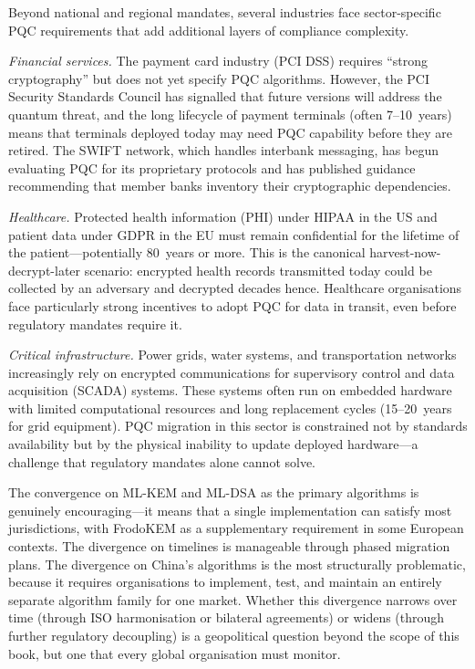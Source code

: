 Beyond national and regional mandates, several industries face sector-specific PQC requirements that add additional layers of compliance complexity.

\emph{Financial services.} The payment card industry (PCI DSS) requires ``strong cryptography'' but does not yet specify PQC algorithms. However, the PCI Security Standards Council has signalled that future versions will address the quantum threat, and the long lifecycle of payment terminals (often 7--10~years) means that terminals deployed today may need PQC capability before they are retired. The SWIFT network, which handles interbank messaging, has begun evaluating PQC for its proprietary protocols and has published guidance recommending that member banks inventory their cryptographic dependencies.

\emph{Healthcare.} Protected health information (PHI) under HIPAA in the US and patient data under GDPR in the EU must remain confidential for the lifetime of the patient---potentially 80~years or more. This is the canonical harvest-now-decrypt-later scenario: encrypted health records transmitted today could be collected by an adversary and decrypted decades hence. Healthcare organisations face particularly strong incentives to adopt PQC for data in transit, even before regulatory mandates require it.

\emph{Critical infrastructure.} Power grids, water systems, and transportation networks increasingly rely on encrypted communications for supervisory control and data acquisition (SCADA) systems. These systems often run on embedded hardware with limited computational resources and long replacement cycles (15--20~years for grid equipment). PQC migration in this sector is constrained not by standards availability but by the physical inability to update deployed hardware---a challenge that regulatory mandates alone cannot solve.

The convergence on ML-KEM and ML-DSA as the primary algorithms is genuinely encouraging---it means that a single implementation can satisfy most jurisdictions, with FrodoKEM as a supplementary requirement in some European contexts. The divergence on timelines is manageable through phased migration plans. The divergence on China's algorithms is the most structurally problematic, because it requires organisations to implement, test, and maintain an entirely separate algorithm family for one market. Whether this divergence narrows over time (through ISO harmonisation or bilateral agreements) or widens (through further regulatory decoupling) is a geopolitical question beyond the scope of this book, but one that every global organisation must monitor.

